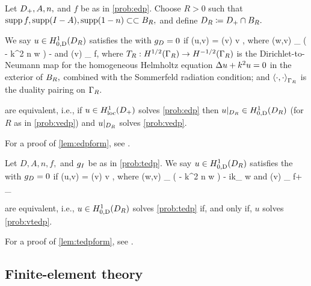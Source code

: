 \bprob[Variational formulation of EDP when $\gD = 0$]\label{prob:vedp}
Let $D_{+}, A, n,$ and $f$ be as in \cref{prob:edp}. Choose $R>0$ such that $\operatorname{supp} f, \operatorname{supp}(I-A), \operatorname{supp}(1-n) \subset\subset B_{R},$ and define $D_{R} \coloneqq D_{+} \cap B_{R}.$

We say $u \in \HozDDR$ satisfies the  with $\gD = 0$ if
\beqs
\aE(u,v) = \FE(v) \tfa v \in \HozDDR,
\eeqs
where
\beqs
\aE(w,v) \de \int_{\DR} \mleft( - k^2 n w \vbar\mright) - 
\eeqs
and
\beqs
\FE(v) \de \int_{\DR} f\vbar,
\eeqs
where $\TR:\HhGR\rightarrow \HmhGR$ is the Dirichlet-to-Neumann map for the homogeneous Helmholtz equation $\Delta u + k^2 u = 0$ in the exterior of $B_{R},$ combined with the Sommerfeld radiation condition; and $\DPGR{\cdot}{\cdot}$ is the duality pairing on $\Gamma_{R}.$
\eprob

\label{lem:edpform}
 are equivalent, i.e., if $u \in \HolocDp$ solves \cref{prob:edp} then $u\restrict_{\DR} \in \HozDDR$ (for $R$ as in \cref{prob:vedp}) and $u|_{D_{R}}$ solves \cref{prob:vedp}.
\ele

For a proof of \cref{lem:edpform}, see \cite[Lemma 3.3]{GrPeSp:19}.

\bprob[Variational formulation of TEDP when $\gD = 0$]\label{prob:vtedp}
Let $D, A, n, f,$ and $g_{I}$ be as in \cref{prob:tedp}. We say $u \in \HozDDR$ satisfies the  with $\gD = 0$ if
\beqs
\aT(u,v) = \FT(v) \tfa v \in \HozDDR,
\eeqs
where
\beqs
\aT(w,v) \de \int_{\DR} \mleft( - k^2 n w \vbar\mright) - ik\int_{\GI} \trGI w\trGI \vbar
\eeqs
and
\beqs
\FT(v) \de \int_{\DR} f\vbar + \int_{\GI} \gI \trGI \vbar
\eeqs
\eprob
{}

\label{lem:tedpform}
 are equivalent, i.e., $u \in \HozDDR$ solves \cref{prob:tedp} if, and only if, $u$ solves \cref{prob:vtedp}.
\ele

For a proof of \cref{lem:tedpform}, see \cite[Lemma A.7]{GrPeSp:19}.
  
\subsection{Finite-element theory}\label{sec:fetheory}

